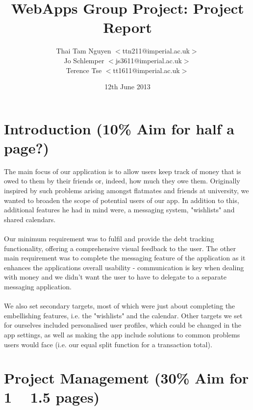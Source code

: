 \documentclass[a4paper,11pt]{article}
\begin{document}
\title{WebApps Group Project: Project Report} \date{12th June
  2013} \author{
  Thai Tam Nguyen $<$ttn211@imperial.ac.uk$>$\\
  Jo Schlemper $<$js3611@imperial.ac.uk$>$\\
  Terence Tse  $<$tt1611@imperial.ac.uk$>$ }
\maketitle

\section*{Introduction (10\% Aim for half a page?)}

     The main focus of our application is to allow users  keep track of money that is owed to them by their friends or, indeed, how much they owe them. Originally inspired by such problems arising amongst flatmates and friends at university, we wanted to broaden the scope of potential users of our app. In addition to this, additional features he had in mind were, a messaging system, "wishlists" and shared calendars.
\\
\\     Our minimum requirement was to fulfil and provide the debt tracking functionality, offering a comprehensive visual feedback to the user. The other main requirement was to complete the messaging feature of the application as it enhances the applications overall usability - communication is key when dealing with money and we didn't want the user to have to delegate to a separate messaging application.
\\
\\     We also set secondary targets, most of which were just about completing the embellishing features, i.e. the "wishlists" and the calendar. Other targets we set for ourselves included personalised user profiles, which could be changed in the app settings, as well as making the app include solutions to common problems users would face (i.e. our equal split function for a transaction total). 



\section*{Project Management (30\% Aim for 1 ~ 1.5 pages)}
\end{document}
